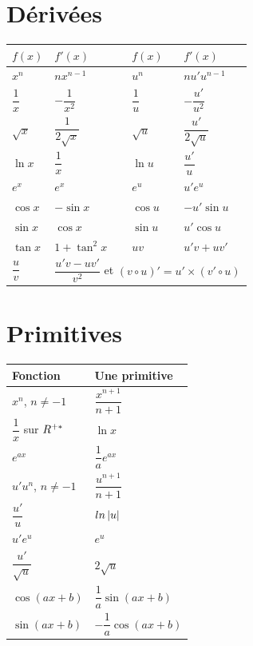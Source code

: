 \section*{Dérivées}

\begin{center}
\setlength{\tabcolsep}{9pt}
\renewcommand{\arraystretch}{1.5}
\begin{tabular}{@{}llll@{}}
\toprule
$f(x)$ & $f'(x)$ & $f(x)$ & $f'(x)$ \\
\midrule
$x^{n}$ & $nx^{n-1}$ & $u^{n}$ & $nu'u^{n-1}$ \\
$\dfrac1x$ & $-\dfrac{1}{x^{2}}$ & $\dfrac1u$ & $-\dfrac{u'}{u^{2}}$ \\
$\sqrt x$ & $\dfrac{1}{2\sqrt x}$ & $\sqrt u$ & $\dfrac{u'}{2\sqrt u}$ \\
$\ln x$ & $\dfrac1x$ & $\ln u$ & $\dfrac{u'}{u}$ \\
$e^{x}$ & $e^{x}$ & $e^{u}$ & $u'e^{u}$ \\
$\cos x$ & $-\sin x$ & $\cos u$ & $-u'\sin u$ \\
$\sin x$ & $\cos x$ & $\sin u$ & $u'\cos u$ \\
$\tan x$ & $1+\tan^{2}x$ & $uv$ & $u'v+uv'$ \\
$\dfrac uv$ & \multicolumn{3}{l}{$\dfrac{u'v-uv'}{v^{2}}$ \qquad et
$\left(v \circ u\right)' = u' \times \left(v' \circ u\right)$} \\
\bottomrule
\end{tabular}
\end{center}

\section*{Primitives}

\begin{center}
\setlength{\tabcolsep}{10pt}
\renewcommand{\arraystretch}{1.55}
\begin{tabular}{@{}ll@{}}
\toprule
Fonction & Une primitive \\
\midrule
$x^{n}$, $n \neq -1$ & $\dfrac{x^{n+1}}{n+1}$ \\
$\dfrac1x$ sur $R^{+*}$ & $\ln x$ \\
$e^{ax}$ & $\dfrac1a e^{ax}$ \\
$u'u^{n}$, $n \neq -1$ & $\dfrac{u^{n+1}}{n+1}$ \\
$\dfrac{u'}{u}$ & $ln\left|u\right|$ \\
$u'e^{u}$ & $e^{u}$ \\
$\dfrac{u'}{\sqrt u}$ & $2\sqrt u$ \\
$\cos(ax+b)$ & $\dfrac1a\sin(ax+b)$ \\
$\sin(ax+b)$ & $-\dfrac1a\cos(ax+b)$ \\
\bottomrule
\end{tabular}
\end{center}

